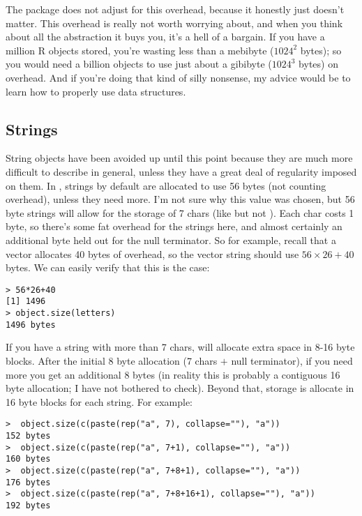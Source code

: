 The  package does not adjust for this overhead, because it honestly just doesn't matter.  This overhead is really not worth worrying about, and when you think about all the abstraction it buys you, it's a hell of a bargain.  If you have a million R objects stored, you're wasting less than a mebibyte ($1024^2$ bytes); so you would need a billion objects to use just about a gibibyte ($1024^3$ bytes) on overhead.  And if you're doing that kind of silly nonsense, my advice would be to learn how to properly use data structures.



\subsection{Strings}

String objects have been avoided up until this point because they are much more difficult to describe in general, unless they have a great deal of regularity imposed on them.  In , strings by default are allocated to use 56 bytes (not counting overhead), unless they need more.  I'm not sure why this value was chosen, but 56 byte strings will allow for the storage of 7 chars (like  but not ).  Each char costs 1 byte, so there's some fat overhead for the strings here, and almost certainly an additional byte held out for the null terminator.  So for example, recall that a vector allocates 40 bytes of overhead, so the vector string  should use $56\times 26 + 40$ bytes.  We can easily verify that this is the case:
\begin{lstlisting}[language=rr]
> 56*26+40
[1] 1496
> object.size(letters)
1496 bytes
\end{lstlisting}

If you have a string with more than 7 chars,  will allocate extra space in 8-16 byte blocks.  After the initial 8 byte allocation (7 chars $+$ null terminator), if you need more you get an additional 8 bytes (in reality this is probably a contiguous 16 byte allocation; I have not bothered to check).  Beyond that, storage is allocate in 16 byte blocks for each string.  For example:
\begin{lstlisting}[language=rr]
>  object.size(c(paste(rep("a", 7), collapse=""), "a")) 
152 bytes
>  object.size(c(paste(rep("a", 7+1), collapse=""), "a")) 
160 bytes
>  object.size(c(paste(rep("a", 7+8+1), collapse=""), "a")) 
176 bytes
>  object.size(c(paste(rep("a", 7+8+16+1), collapse=""), "a")) 
192 bytes
\end{lstlisting}

